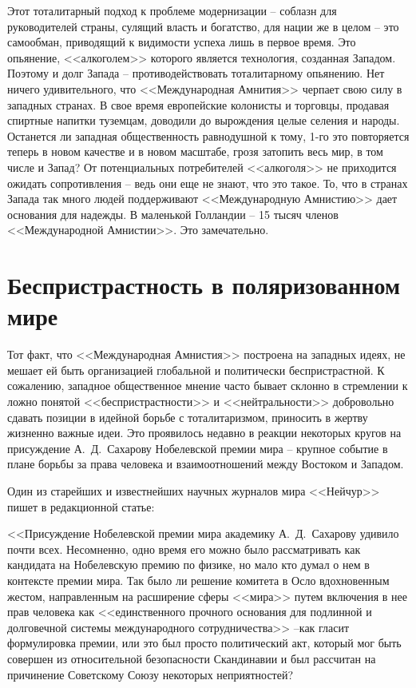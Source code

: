 \documentclass{book}
\begin{document}
Этот тоталитарный подход к проблеме модернизации -- со­блазн для руководителей страны, сулящий власть и богатство, для нации же в целом -- это самообман, приводящий к види­мости успеха лишь в первое время. Это опьянение, <<алкого­лем>> которого является технология, созданная Западом. Поэто­му и долг Запада -- противодействовать тоталитарному опья­нению. Нет ничего удивительного, что <<Международная Амнития>> черпает свою силу в западных странах. В свое время евро­пейские колонисты и торговцы, продавая спиртные напитки туземцам, доводили до вырождения целые селения и народы. Останется ли западная общественность равнодушной к тому, 1-го это повторяется теперь в новом качестве и в новом мас­штабе, грозя затопить весь мир, в том числе и Запад? От потен­циальных потребителей <<алкоголя>> не приходится ожидать сопротивления -- ведь они еще не знают, что это такое.
То, что в странах Запада так много людей поддерживают <<Международную Амнистию>> дает основания для надежды. В маленькой Голландии -- 15 тысяч членов <<Международной Амнистии>>. Это замечательно.


\section{Беспристрастность в поляризованном мире}

Тот факт, что <<Международная Амнистия>> построена на за­падных идеях, не мешает ей быть организацией глобальной и политически беспристрастной. К сожалению, западное обще­ственное мнение часто бывает склонно в стремлении к ложно понятой <<беспристрастности>> и <<нейтральности>> добровольно сдавать позиции в идейной борьбе с тоталитаризмом, прино­сить в жертву жизненно важные идеи. Это проявилось недавно в реакции некоторых кругов на присуждение А.~Д.~Сахарову Нобелевской премии мира -- крупное событие в плане борьбы за права человека и взаимоотношений между Востоком и За­падом.

Один из старейших и известнейших научных журналов ми­ра <<Нейчур>> пишет в редакционной статье:

<<Присуждение Нобелевской премии мира академику А.~Д.~Сахарову удивило почти всех. Несомненно, одно время его можно было рассматривать как кандидата на Нобелевскую премию по физике, но мало кто думал о нем в контексте премии мира. Так было ли решение комитета в Осло вдохновенным жестом, направленным на расширение сферы <<мира>> путем включения в нее прав человека как <<единственного прочного основания для подлинной и долговечной системы международного сотрудничества>> --как гласит формулировка премии, или это был просто политический акт, который мог быть совершен из относительной безопасности Скандинавии и был рассчитан на причинение Советскому Союзу некоторых неприятностей?
\end{document}
